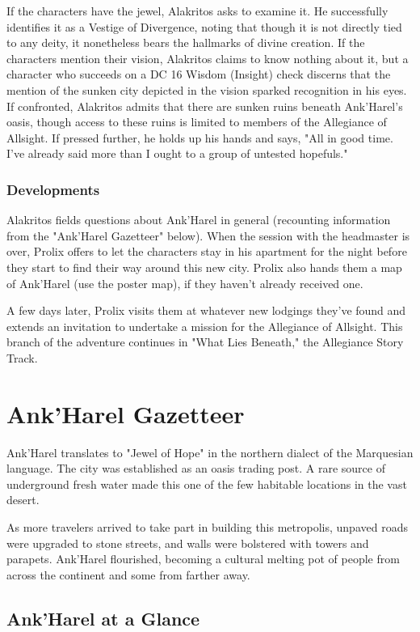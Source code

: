 \documentclass[10pt,a4paper,twoside,bg=print,twocolumn,openany,nodeprecatedcode]{dndbook}
\begin{document}
If the characters have the jewel, Alakritos asks to examine it. He successfully identifies it as a Vestige of Divergence, noting that though it is not directly tied to any deity, it nonetheless bears the hallmarks of divine creation. If the characters mention their vision, Alakritos claims to know nothing about it, but a character who succeeds on a DC 16 Wisdom (Insight) check discerns that the mention of the sunken city depicted in the vision sparked recognition in his eyes. If confronted, Alakritos admits that there are sunken ruins beneath Ank'Harel's oasis, though access to these ruins is limited to members of the Allegiance of Allsight. If pressed further, he holds up his hands and says, "All in good time. I've already said more than I ought to a group of untested hopefuls."

\subsubsection{Developments}
Alakritos fields questions about Ank'Harel in general (recounting information from the "Ank'Harel Gazetteer" below). When the session with the headmaster is over, Prolix offers to let the characters stay in his apartment for the night before they start to find their way around this new city. Prolix also hands them a map of Ank'Harel (use the poster map), if they haven't already received one.

A few days later, Prolix visits them at whatever new lodgings they've found and extends an invitation to undertake a mission for the Allegiance of Allsight. This branch of the adventure continues in "What Lies Beneath," the Allegiance Story Track.

\section{Ank'Harel Gazetteer}
Ank'Harel translates to "Jewel of Hope" in the northern dialect of the Marquesian language. The city was established as an oasis trading post. A rare source of underground fresh water made this one of the few habitable locations in the vast desert.

As more travelers arrived to take part in building this metropolis, unpaved roads were upgraded to stone streets, and walls were bolstered with towers and parapets. Ank'Harel flourished, becoming a cultural melting pot of people from across the continent and some from farther away.

\subsection{Ank'Harel at a Glance}
\end{document}
